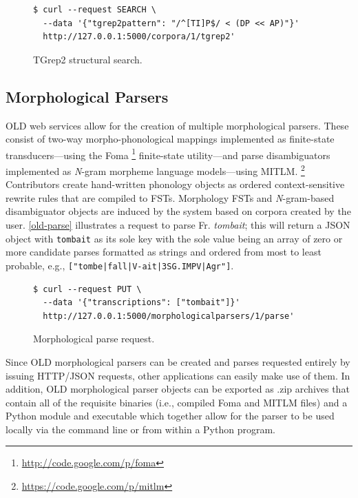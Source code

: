 \documentclass[11pt]{article}
\begin{document}
\begin{figure}[h]
\scriptsize
\begin{verbatim}
$ curl --request SEARCH \
  --data '{"tgrep2pattern": "/^[TI]P$/ < (DP << AP)"}'
  http://127.0.0.1:5000/corpora/1/tgrep2'
\end{verbatim}
\normalsize
\caption{TGrep2 structural search.}
\label{old-tgrep2}
\end{figure}



\subsection{Morphological Parsers}

OLD web services allow for the creation of multiple morphological parsers.
These consist of two-way morpho-phonological mappings implemented as
finite-state transducers---using the Foma%
\footnote{\url{http://code.google.com/p/foma}} %
finite-state utility---and parse disambiguators implemented as \textit{N}-gram
morpheme language models---using MITLM.%
\footnote{\url{https://code.google.com/p/mitlm}}
Contributors create hand-written phonology objects as ordered context-sensitive
rewrite rules that are compiled to FSTs. Morphology FSTs and \textit{N}-gram-based
disambiguator objects are induced by the system based on corpora created by the 
user. \autoref{old-parse} illustrates a request to parse Fr. \textit{tombait};
this will return a JSON object with \texttt{tombait} as its sole key with the 
sole value being an array of zero or more candidate parses formatted as strings and 
ordered from most to least probable, e.g., \texttt{["tombe|fall|V-ait|3SG.IMPV|Agr"]}.

\begin{figure}[h]
\scriptsize
\begin{verbatim}
$ curl --request PUT \
  --data '{"transcriptions": ["tombait"]}'
  http://127.0.0.1:5000/morphologicalparsers/1/parse'
\end{verbatim}
\normalsize
\caption{Morphological parse request.}
\label{old-parse}
\end{figure}

Since OLD morphological parsers can be created and parses requested entirely by
issuing HTTP/JSON requests, other applications can easily make use of them. In
addition, OLD morphological parser objects can be exported as .zip archives
that contain all of the requisite binaries (i.e., compiled Foma and MITLM
files) and a Python module and executable which together allow for the parser
to be used locally via the command line or from within a Python program.
\end{document}
